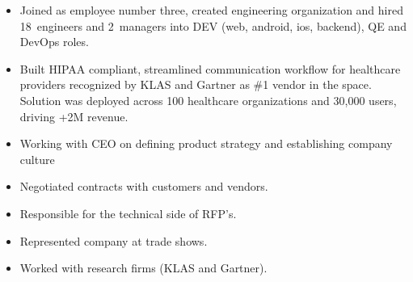 \documentclass[11pt,a4paper,roman]{moderncv}       %
\begin{document}
{%


\begin{itemize}
    \item Joined as employee number three, created engineering organization and hired 18~engineers and 2~managers into DEV (web, android, ios, backend), QE and DevOps roles. 
    \item Built HIPAA compliant, streamlined communication workflow for healthcare providers recognized by KLAS and Gartner as \#1 vendor in the space. Solution was deployed across 100 healthcare organizations and 30,000 users, driving +2M revenue.
    \item Working with CEO on defining product strategy and establishing company culture 
    \item Negotiated contracts with customers and vendors.
    \item Responsible for the technical side of RFP's.
    \item Represented company at trade shows.
    \item Worked with research firms (KLAS and Gartner).
\end{itemize}

\bigskip


}
\end{document}
